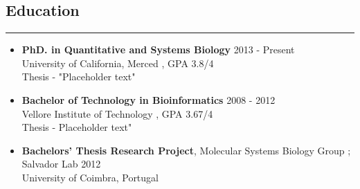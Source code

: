 \documentclass[line,margin]{resume_type2}
\begin{document}
\address{  your@email \\ (123) 456-7890 }
\address{ \href {http://r.in}   {www.r.in} \\  \href {http://github.com/rg-code} {github.com/rg-code}}

\begin{resume}

\section{Education}\hskip 4pt {\hfill \color{gray} \rule{14.7 cm}{0.1 pt}}
\begin{itemize}
                    \vskip 3pt
                    \item[]
                    {\textbf{PhD. in Quantitative and Systems Biology}}{\color{gray} \hfill 2013 - Present}\\
                    {University of California, Merced} {, GPA 3.8/4}\\
                    {\small{ Thesis} - "Placeholder text"}
                    \vskip 5pt
                    \item[]
                    {\textbf{Bachelor of Technology in Bioinformatics }} {\color{gray} \hfill 2008 - 2012}\\
                    Vellore Institute of Technology , GPA 3.67/4 \\
                    {\small{ Thesis} - Placeholder text"}
                    \item[]
                    \vskip 5pt
                    {\textbf{Bachelors' Thesis Research Project}}, { Molecular Systems Biology Group ; Salvador Lab}{\color{gray} \hfill 2012} \\
                    University of Coimbra, Portugal
		            
\end{itemize}
		            \vskip 10pt
		            

\end{resume}
\end{document}

